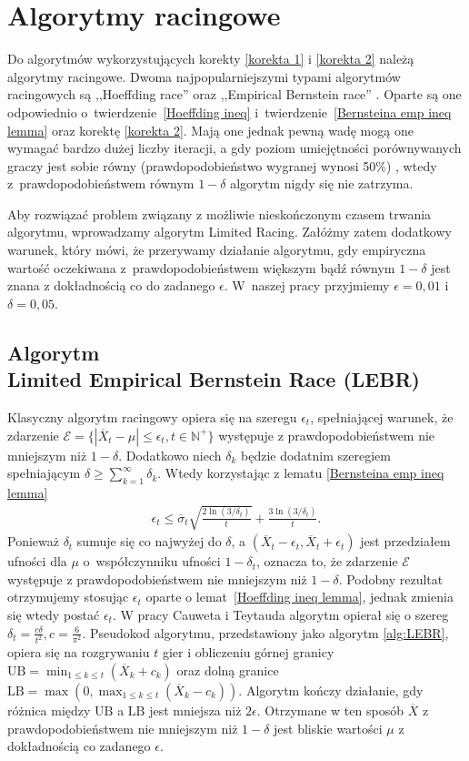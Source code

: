\documentclass[inzynierska]{pwr_wmat_praca_dyplomowa}
\theoremstyle{plain}
\numberwithin{theorem}{chapter}
\theoremstyle{definition}
\numberwithin{theorem}{chapter}
\begin{document}
	\chapter{Algorytmy racingowe}
	Do algorytmów wykorzystujących korekty \ref{korekta 1} i \ref{korekta 2} należą algorytmy racingowe. Dwoma najpopularniejszymi typami algorytmów racingowych są ,,Hoeffding race'' \cite{Maron-1993-15969} oraz ,,Empirical Bernstein race'' \cite{Mnih_2008}.
	Oparte są one odpowiednio o~twierdzenie~\ref{Hoeffding ineq} i~twierdzenie~\ref{Bernsteina emp ineq lemma} oraz korektę \ref{korekta 2}. Mają one jednak pewną wadę \pauza mogą one wymagać bardzo dużej liczby iteracji, a gdy poziom umiejętności porównywanych graczy jest sobie równy (prawdopodobieństwo wygranej wynosi 50\%)%
	, wtedy z~prawdopodobieństwem równym $1-\delta$ algorytm nigdy się nie zatrzyma.
	
	Aby rozwiązać problem związany z możliwie nieskończonym czasem trwania algorytmu, wprowadzamy algorytm Limited Racing. Załóżmy zatem dodatkowy warunek, który mówi, że przerywamy działanie algorytmu, gdy empiryczna wartość oczekiwana z~prawdopodobieństwem większym bądź równym $1-\delta$ jest znana z dokładnością co do zadanego $\epsilon$. W~naszej pracy przyjmiemy $\epsilon=0,01$ i $\delta = 0,05$.
	\section{Algorytm \\Limited Empirical Bernstein Race (LEBR) }
	Klasyczny algorytm racingowy opiera się na szeregu $\epsilon_t$, spełniającej warunek, że zdarzenie $\mathcal{E}= \{|\overline{X}_t - \mu | \le \epsilon_t,  t\in \mathbb{N}^+\}$ występuje z prawdopodobieństwem nie mniejszym niż $1-\delta$. Dodatkowo niech $\delta_k$ będzie dodatnim szeregiem spełniającym $ \delta \ge \sum_{k = 1}^{\infty}\delta_k$. Wtedy korzystając z lematu \ref{Bernsteina emp ineq lemma}
	\begin{gather*}
		\epsilon_t \le  \overline{\sigma}_t \sqrt{\frac{2\ln(3/\delta_t)}{t}} + \frac{3  \ln{(3 / \delta_t)}}{t}.
	\end{gather*}
	\noindent
	Ponieważ $\delta_t$ sumuje się co najwyżej do $\delta$, a $(\overline{X}_t - \epsilon_t, \overline{X}_t + \epsilon_t)$ jest przedziałem ufności dla $\mu$ o~współczynniku ufności $1-\delta_t$, oznacza to, że zdarzenie $\mathcal{E}$ występuje z prawdopodobieństwem nie mniejszym niż $1-\delta$. Podobny rezultat otrzymujemy stosując $\epsilon_t$ oparte o lemat~\ref{Hoeffding ineq lemma}, jednak zmienia się wtedy postać $\epsilon_t$. W pracy Cauweta i Teytauda \cite{cauwet2018surprising} algorytm opierał się o szereg $\delta_t=\frac{c\delta}{t^2}, c=\frac{6}{\pi^2}$.
	Pseudokod algorytmu, przedstawiony jako algorytm \ref{alg:LEBR}, opiera się na rozgrywaniu $t$ gier i obliczeniu górnej granicy $\text{UB} = \min_{1\le k\le t}( \overline{X}_k+c_k)$ oraz dolną granice $\text{LB} = \max(0, \max_{1\le k\le t}(\overline{X}_k-c_k))$. Algorytm kończy działanie, gdy różnica między $\text{UB}$ a $\text{LB}$ jest mniejsza niż $2\epsilon$. Otrzymane w ten sposób $\overline{X}$ z prawdopodobieństwem nie mniejszym niż $1 - \delta$ jest bliskie wartości $\mu$ z dokładnością co zadanego $\epsilon$.
\end{document}
